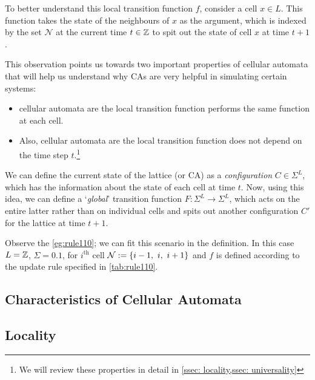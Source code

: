 \documentclass[11pt, oneside]{scrbook}
\begin{document}
To better understand this local transition function \(f\), consider a cell \(x \in L\). This function takes the state of the neighbours of \(x\) as the argument, which is indexed by the set \(\mathcal{N}\) at the current time \(t \in \mathbb Z\) to spit out the state of cell $x$ at time $t + 1$.

\noindent This observation points us towards two important properties of cellular automata that will help us understand why CAs are very helpful in simulating certain systems:

\begin{itemize}
    \item cellular automata are  \ie the local transition function performs the same function at each cell.
    \item Also, cellular automata are  \ie the local transition function does not depend on the time step $t$.\footnote{We will review these properties in detail in \cref{ssec: locality,ssec: universality}}
\end{itemize}

\noindent We can define the current state of the lattice (or CA) as a \emph{configuration} \(C \in \Sigma^{L}\), which has the information about the state of each cell at time \(t\). Now, using this idea, we can define a `\emph{global}' transition function \(F: \Sigma^{L} \to \Sigma^{L}\), which acts on the entire latter rather than on individual cells and spits out another configuration \(C'\) for the lattice at time \(t+1\).

\begin{remark}
    Observe the \cref{eg:rule110}; we can fit this scenario in the definition. In this case \(L = \mathbb Z\), \(\Sigma = \qty{0, 1}\), for $i^{\text{th}}$ cell \(\mathcal{N} := \qty{i-1,~ i,~ i+1}\) and \(f\) is defined according to the update rule specified in \cref{tab:rule110}.
\end{remark}

\subsection{Characteristics of Cellular Automata}

\subsection{Locality} \label{ssec: locality}
\end{document}
